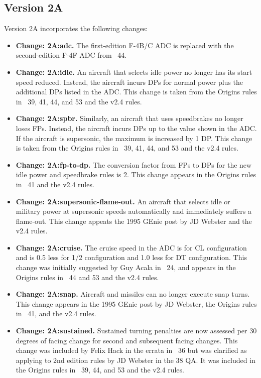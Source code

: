 \documentclass[10pt]{article}
\newcommand{\itemtag}[1]{\item \textbf{Change: #1.}}
\begin{document}
\subsection{Version 2A}

Version 2A incorporates the following changes:

\begin{itemize}

    \itemtag{2A:adc} The first-edition F-4B/C ADC is replaced with the second-edition F-4F ADC from {\APJ}~44.

    \itemtag{2A:idle} An aircraft that selects idle power no longer has its start speed reduced. Instead, the aircraft incurs DPs for normal power plus the additional DPs listed in the ADC. This change is taken from the Origins rules in {\APJ}~39, 41, 44, and 53 and the v2.4 rules. 

    \itemtag{2A:spbr} Similarly, an aircraft that uses speedbrakes no longer loses FPs. Instead, the aircraft incurs DPs up to the value shown in the ADC. If the aircraft is supersonic, the maximum is increased by 1 DP. This change is taken from the Origins rules in {\APJ}~39, 41, 44, and 53 and the v2.4 rules.

    \itemtag{2A:fp-to-dp} The conversion factor from FPs to DPs for the new idle power and speedbrake rules is 2. This change appears in the Origins rules in {\APJ}~41 and the v2.4 rules.

    \itemtag{2A:supersonic-flame-out} An aircraft that selects idle or military power at supersonic speeds automatically and immediately suffers a flame-out. This change appeats the 1995 GEnie post by JD Webster and the v2.4 rules.

    \itemtag{2A:cruise} The cruise speed in the ADC is for CL configuration and is 0.5 less for 1/2 configuration and 1.0 less for DT configuration. This change was initially suggested by Guy Acala in {\APJ}~24, and appears in the Origins rules in {\APJ}~44 and 53 and the v2.4 rules.

    \itemtag{2A:snap} Aircraft and missiles can no longer execute snap turns. This change appears in the 1995 GEnie post by JD Webster, the Origins rules in {\APJ}~41, and the v2.4 rules.

    \itemtag{2A:sustained} Sustained turning penalties are now assessed per 30 degrees of facing change for second and subsequent facing changes. This change was included by Felix Hack in the errata in {\APJ}~36 but was clarified as applying to 2nd edition rules by JD Webster in the {\APJ} 38 QA. It was included in the Origins rules in {\APJ}~39, 44, and 53 and the v2.4 rules.


\end{itemize}
\end{document}
